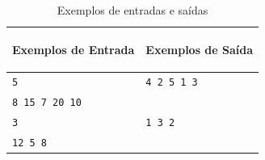 \begin{table}[h]
    \centering
    \begin{tabular}{|p{7cm}|p{7cm}|}
        \hline
        \begin{center}
            \vspace{-0.3cm}
            \textbf{Exemplos de Entrada}
            \vspace{-0.3cm}
        \end{center} 
         &  
        \begin{center}
            \vspace{-0.3cm}
            \textbf{Exemplos de Saída}
            \vspace{-0.3cm}
        \end{center} \\ \hline
        \texttt{5} & \texttt{4 2 5 1 3} \\ 
        \texttt{8 15 7 20 10} & \texttt{} \\ \hline
        \texttt{3} & \texttt{1 3 2} \\ 
        \texttt{12 5 8} & \texttt{} \\ \hline
    \end{tabular}
    \caption{Exemplos de entradas e saídas}
    \label{tab:inputc3}
\end{table}

\newpage

\begin{center}
\noindent

\end{center}